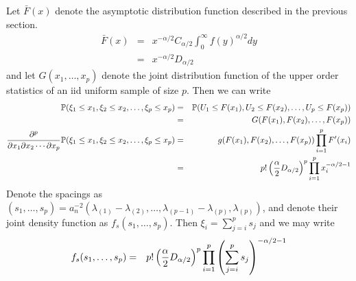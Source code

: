 \documentclass{article}
\begin{document}
Let $\bar{F}(x)$ denote the asymptotic distribution function described in the previous section.
\begin{eqnarray*}
  \bar{F}(x) &=& x^{-\alpha/2} C_{\alpha/2} \int_0^\infty f(y)^{\alpha/2} dy  \\
  &=& x^{-\alpha/2} D_{\alpha/2}
\end{eqnarray*}
and let $G(x_1, \dots, x_p)$ denote the joint distribution function of the upper order statistics of an iid
uniform sample of size $p$. Then we can write
\begin{eqnarray*}
\P(\xi_1 \leq x_1, \xi_2 \leq x_2, \dots, \xi_p \leq x_p) &=&
\P(U_1 \leq F(x_1), U_2 \leq F(x_2), \dots, U_p \leq F(x_p)) \\
  &=& G(F(x_1), F(x_2), \dots, F(x_p)) \\
\frac{\partial^p}{\partial x_1\partial x_2 \cdots \partial x_p}
\P(\xi_1 \leq x_1, \xi_2 \leq x_2, \dots, \xi_p \leq x_p) &=&
g(F(x_1), F(x_2), \dots, F(x_p)) \prod_{i=1}^p F'(x_i) \\
  &=& p! \left(
      {\alpha \over 2} D_{\alpha/2}
      \right)^p \prod_{i=1}^p x_i^{-\alpha/2 - 1}
\end{eqnarray*}
Denote the spacings as $(s_1, \dots, s_p) = a_n^{-2} (\lambda_{(1)} - \lambda_{(2)}, \dots,
\lambda_{(p-1)} - \lambda_{(p)}, \lambda_{(p)})$, and denote their joint density function as
$f_s(s_1, \dots, s_p)$. Then $\xi_i = \sum_{j=i}^p s_j$ and we may write
\begin{eqnarray*}
  f_s(s_1, \dots, s_p) &=& p! \left(
      {\alpha \over 2} D_{\alpha/2}
      \right)^p \prod_{i=1}^p \left(
                           \sum_{j=i}^p s_j
                           \right)^{-\alpha/2 - 1}
\end{eqnarray*}


\end{document}
